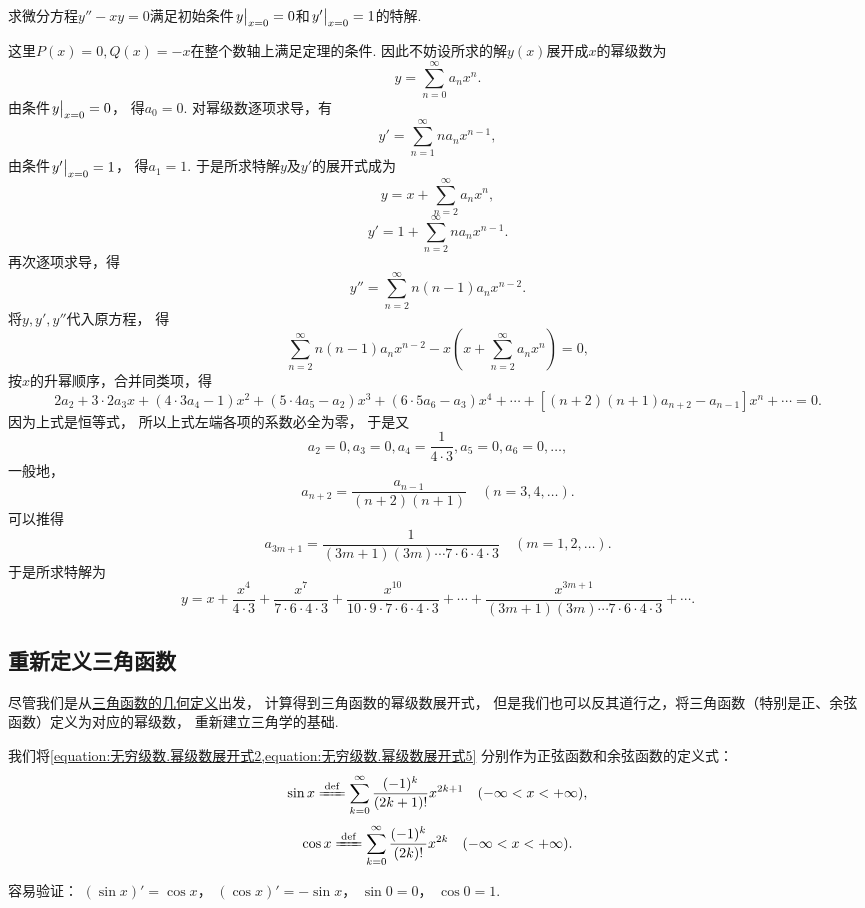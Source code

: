 \begin{example}
求微分方程\(y''-xy=0\)满足初始条件\(\eval{y}_{x=0}=0\)和\(\eval{y'}_{x=0}=1\)的特解.
\begin{solution}
这里\(P(x)=0, Q(x)=-x\)在整个数轴上满足定理的条件.
因此不妨设所求的解\(y(x)\)展开成\(x\)的幂级数为\[
	y = \sum_{n=0}^\infty a_n x^n.
\]
由条件\(\eval{y}_{x=0}=0\)，
得\(a_0=0\).
对幂级数逐项求导，有\[
	y' = \sum_{n=1}^\infty n a_n x^{n-1},
\]
由条件\(\eval{y'}_{x=0}=1\)，
得\(a_1=1\).
于是所求特解\(y\)及\(y'\)的展开式成为\[
	y = x + \sum_{n=2}^\infty a_n x^n,
\]\[
	y' = 1 + \sum_{n=2}^\infty n a_n x^{n-1}.
\]
再次逐项求导，得\[
	y'' = \sum_{n=2}^\infty n(n-1) a_n x^{n-2}.
\]
将\(y,y',y''\)代入原方程，
得\[
	\sum_{n=2}^\infty n(n-1) a_n x^{n-2}
	- x \left( x + \sum_{n=2}^\infty a_n x^n \right)
	= 0,
\]
按\(x\)的升幂顺序，合并同类项，得\[
	2 a_2 + 3\cdot2 a_3 x + (4\cdot3 a_4 - 1) x^2
	+ (5\cdot4 a_5 - a_2) x^3 + (6\cdot5 a_6 - a_3) x^4
	+ \dotsb + [(n+2)(n+1) a_{n+2} - a_{n-1}] x^n + \dotsb
	= 0.
\]
因为上式是恒等式，
所以上式左端各项的系数必全为零，
于是又\[
	a_2 = 0,
	a_3 = 0,
	a_4 = \frac{1}{4\cdot3},
	a_5 = 0,
	a_6 = 0,
	\dotsc,
\]
一般地，\[
	a_{n+2} = \frac{a_{n-1}}{(n+2)(n+1)}
	\quad(n=3,4,\dotsc).
\]
可以推得\[
	a_{3m+1} = \frac{1}{(3m+1)(3m) \dotsm 7\cdot6\cdot4\cdot3}
	\quad(m=1,2,\dotsc).
\]
于是所求特解为\[
	y = x + \frac{x^4}{4\cdot3} + \frac{x^7}{7\cdot6\cdot4\cdot3}
	+ \frac{x^{10}}{10\cdot9\cdot7\cdot6\cdot4\cdot3}
	+ \dotsb
	+ \frac{x^{3m+1}}{(3m+1)(3m) \dotsm 7\cdot6\cdot4\cdot3}
	+ \dotsb.
\]
\end{solution}
\end{example}

\subsection{重新定义三角函数}
尽管我们是从\hyperref[definition:函数.三角函数的几何定义]{三角函数的几何定义}出发，
计算得到三角函数的幂级数展开式，
但是我们也可以反其道行之，将三角函数（特别是正、余弦函数）定义为对应的幂级数，
重新建立三角学的基础.

我们将\cref{equation:无穷级数.幂级数展开式2,equation:无穷级数.幂级数展开式5}
分别作为正弦函数和余弦函数的定义式：
\[
	\sin x \defeq \sum_{k=0}^\infty \frac{(-1)^k}{(2k+1)!} x^{2k+1}
	\quad(-\infty<x<+\infty),
\]\[
	\cos x \defeq \sum_{k=0}^\infty \frac{(-1)^k}{(2k)!} x^{2k}
	\quad(-\infty<x<+\infty).
\]

容易验证：
\((\sin x)' = \cos x\)，
\((\cos x)' = - \sin x\)，
\(\sin 0 = 0\)，
\(\cos 0 = 1\).

